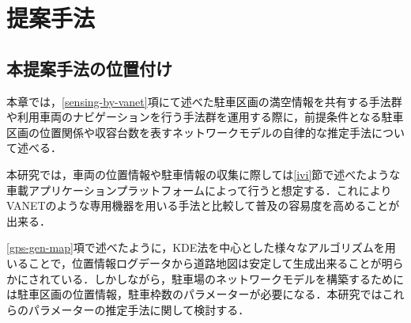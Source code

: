 \chapter{提案手法}
\label{proposal}
\section{本提案手法の位置付け}
\label{issue-to-solve}
本章では，\ref{sensing-by-vanet}項にて述べた駐車区画の満空情報を共有する手法群や利用車両のナビゲーションを行う手法群を運用する際に，前提条件となる駐車区画の位置関係や収容台数を表すネットワークモデルの自律的な推定手法について述べる．

本研究では，車両の位置情報や駐車情報の収集に際しては\ref{ivi}節で述べたような車載アプリケーションプラットフォームによって行うと想定する．これによりVANETのような専用機器を用いる手法と比較して普及の容易度を高めることが出来る．

\ref{gps-gen-map}項で述べたように，KDE法を中心とした様々なアルゴリズムを用いることで，位置情報ログデータから道路地図は安定して生成出来ることが明らかにされている．しかしながら，駐車場のネットワークモデルを構築するためには駐車区画の位置情報，駐車枠数のパラメーターが必要になる．本研究ではこれらのパラメーターの推定手法に関して検討する．


